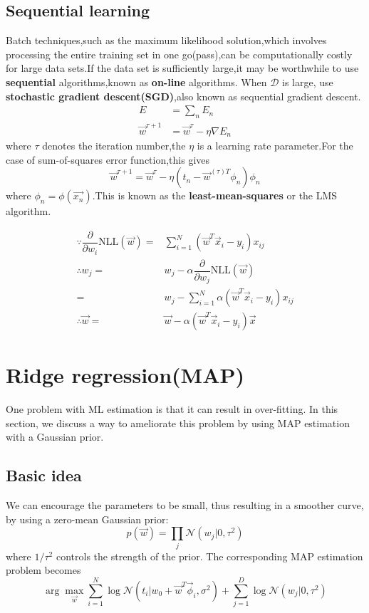 \subsection{Sequential learning}
Batch techniques,such as the maximum likelihood solution,which involves processing the entire training set in one go(pass),can be computationally costly for large data sets.If the data set is sufficiently large,it may be worthwhile to use \textbf{sequential} algorithms,known as \textbf{on-line} algorithms.
When $\mathcal{D}$ is large, use \textbf{stochastic gradient descent(SGD)},also known as sequential gradient descent.
\begin{align}
E &=\sum_{n}E_n \\
\vec{w}^{\tau+1} &= \vec{w}^{\tau}-\eta\nabla E_n
\end{align}
where $\tau$ denotes the iteration number,the $\eta$ is a learning rate parameter.For the case of sum-of-squares error function,this gives
\begin{equation}
\vec{w}^{\tau+1} = \vec{w}^{\tau}-\eta(t_n-\vec{w}^{(\tau)T}\phi_n)\phi_n
\end{equation}
where $\phi_n=\phi(\vec{x_n})$.This is known as the \textbf{least-mean-squares} or the LMS algorithm.


\begin{align}
\because \dfrac{\partial}{\partial w_i}\text{NLL}(\vec{w})=& \sum\limits_{i=1}^N (\vec{w}^T\vec{x}_i-y_i)x_{ij} \\
\therefore w_j=& w_j - \alpha\dfrac{\partial}{\partial w_j}\text{NLL}(\vec{w}) \nonumber \\
                  =& w_j - \sum\limits_{i=1}^N \alpha(\vec{w}^T\vec{x}_i-y_i)x_{ij} \\
\therefore \vec{w}=& \vec{w}-\alpha(\vec{w}^T\vec{x}_i-y_i)\vec{x}
\end{align}


\section{Ridge regression(MAP)}
One problem with ML estimation is that it can result in over-fitting. In this section, we discuss a way to ameliorate this problem by using MAP estimation with a Gaussian prior.

\subsection{Basic idea}
We can encourage the parameters to be small, thus resulting in a smoother curve, by using a zero-mean Gaussian prior:
\begin{equation}
p(\vec{w})=\prod\limits_j \mathcal{N}(w_j|0,\tau^2)
\end{equation}
where $1/\tau^2$ controls the strength of the prior. The corresponding MAP estimation problem becomes
\begin{equation}
\arg\max_{\vec{w}} \sum\limits_{i=1}^N \log{\mathcal{N}(t_i|w_0+\vec{w}^T\vec{\phi}_i,\sigma^2)}+\sum\limits_{j=1}^D \log{\mathcal{N}(w_j|0,\tau^2)}
\end{equation}

